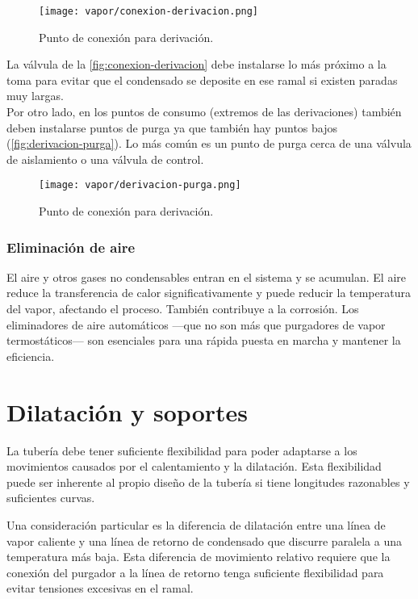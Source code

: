     \begin{figure}
        \centering
        \texttt{[image: vapor/conexion-derivacion.png]}
        \caption{Punto de conexión para derivación.}
        \label{fig:conexion-derivacion}
    \end{figure}

     La válvula de la \autoref{fig:conexion-derivacion} debe instalarse lo más próximo a la toma para evitar que el condensado se deposite en ese ramal si existen paradas muy largas.\\

     Por otro lado, en los puntos de consumo (extremos de las derivaciones) también deben instalarse puntos de purga ya que también hay puntos bajos (\autoref{fig:derivacion-purga}). Lo más común es un punto de purga cerca de una válvula de aislamiento o una válvula de control.
     
    \begin{figure}
        \centering
        \texttt{[image: vapor/derivacion-purga.png]}
        \caption{Punto de conexión para derivación.}
        \label{fig:derivacion-purga}
    \end{figure}
\subsubsection{Eliminación de aire}   
El aire y otros gases no condensables entran en el sistema y se acumulan. El aire reduce la transferencia de calor significativamente y puede reducir la temperatura del vapor, afectando el proceso. También contribuye a la corrosión. Los eliminadores de aire automáticos —que no son más que purgadores de vapor termostáticos— son esenciales para una rápida puesta en marcha y mantener la eficiencia.

\section{Dilatación y soportes}

La tubería debe tener suficiente flexibilidad para poder adaptarse a los movimientos causados por el calentamiento y la dilatación. Esta flexibilidad puede ser inherente al propio diseño de la tubería si tiene longitudes razonables y suficientes curvas.


Una consideración particular es la diferencia de dilatación entre una línea de vapor caliente y una línea de retorno de condensado que discurre paralela a una temperatura más baja. Esta diferencia de movimiento relativo requiere que la conexión del purgador a la línea de retorno tenga suficiente flexibilidad para evitar tensiones excesivas en el ramal.

